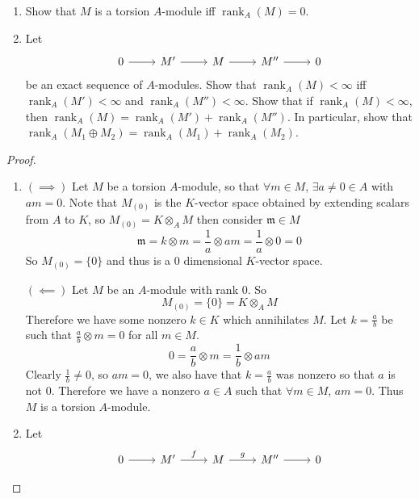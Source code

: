 \documentclass[hidelinks,12pt]{article}
\newcommand{\rk}{\operatorname{rank}}
\begin{document}
\begin{enumerate}
        \begin{enumerate}[label=(\alph*).]
            \item Show that \(M\) is a torsion \(A\)-module iff \(\rk_{A}(M)=0\).
            \item Let \[
                    \begin{tikzcd}
                        0\arrow[r] & M' \arrow[r] & M\arrow[r] & M''\arrow[r] & 0
                    \end{tikzcd}
                \] be an exact sequence of \(A\)-modules. Show that \(\rk_{A}(M)<\infty\) iff \(\rk_{A}(M')<\infty\) and \(\rk_{A}(M'')<\infty\). Show that if \(\rk_{A}(M)<\infty\), then \(\rk_{A}(M)=\rk_{A}(M')+\rk_{A}(M'')\). In particular, show that \(\rk_{A}(M_{1}\oplus M_{2})=\rk_{A}(M_{1})+\rk_{A}(M_{2})\).
        \end{enumerate}
        \begin{proof}
            \begin{enumerate}[label=(\alph*).]
                \item \((\implies)\) Let \(M\) be a torsion \(A\)-module, so that \(\forall m\in M\), \(\exists a\neq0\in A\) with \(am=0\). Note that \(M_{(0)}\) is the \(K\)-vector space obtained by extending scalars from \(A\) to \(K\), so \(M_{(0)}=K\otimes_{A} M\) then consider \(\mathfrak{m}\in M\)
                    \[
                        \mathfrak{m}=k\otimes m=\frac{1}{a}\otimes am=\frac{1}{a}\otimes 0=0
                    \]
                    So \(M_{(0)}=\{0\}\) and thus is a 0 dimensional \(K\)-vector space.
                    \par\null\par
                    \((\impliedby)\) Let \(M\) be an \(A\)-module with rank 0. So \[M_{(0)}=\{0\}=K\otimes_{A} M\] Therefore we have some nonzero \(k\in K\) which annihilates \(M\). Let \(k=\frac{a}{b}\) be such that \(\frac{a}{b}\otimes m=0\) for all \(m\in M\). \[
                    0=\frac{a}{b}\otimes m=\frac{1}{b}\otimes am
                \]
                Clearly \(\frac{1}{b}\neq0\), so \(am=0\), we also have that \(k=\frac{a}{b}\) was nonzero so that \(a\) is not 0. Therefore we have a nonzero \(a\in A\) such that \(\forall m\in M\), \(am=0\). Thus \(M\) is a torsion \(A\)-module.
            \item Let \[
                    \begin{tikzcd}
                        0\arrow[r] & M' \arrow[r, "f"] & M\arrow[r, "g"] & M''\arrow[r] & 0
                    \end{tikzcd}
\]
\end{enumerate}
\end{proof}
\end{enumerate}
\end{document}
